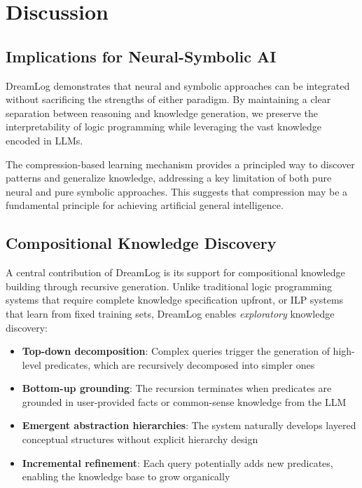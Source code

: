 \documentclass[10pt,conference]{IEEEtran}
\begin{document}
\section{Discussion}

\subsection{Implications for Neural-Symbolic AI}

DreamLog demonstrates that neural and symbolic approaches can be integrated without sacrificing the strengths of either paradigm. By maintaining a clear separation between reasoning and knowledge generation, we preserve the interpretability of logic programming while leveraging the vast knowledge encoded in LLMs.

The compression-based learning mechanism provides a principled way to discover patterns and generalize knowledge, addressing a key limitation of both pure neural and pure symbolic approaches. This suggests that compression may be a fundamental principle for achieving artificial general intelligence.

\subsection{Compositional Knowledge Discovery}

A central contribution of DreamLog is its support for compositional knowledge building through recursive generation. Unlike traditional logic programming systems that require complete knowledge specification upfront, or ILP systems that learn from fixed training sets, DreamLog enables \textit{exploratory} knowledge discovery:

\begin{itemize}
\item \textbf{Top-down decomposition}: Complex queries trigger the generation of high-level predicates, which are recursively decomposed into simpler ones
\item \textbf{Bottom-up grounding}: The recursion terminates when predicates are grounded in user-provided facts or common-sense knowledge from the LLM
\item \textbf{Emergent abstraction hierarchies}: The system naturally develops layered conceptual structures without explicit hierarchy design
\item \textbf{Incremental refinement}: Each query potentially adds new predicates, enabling the knowledge base to grow organically
\end{itemize}
\end{document}
